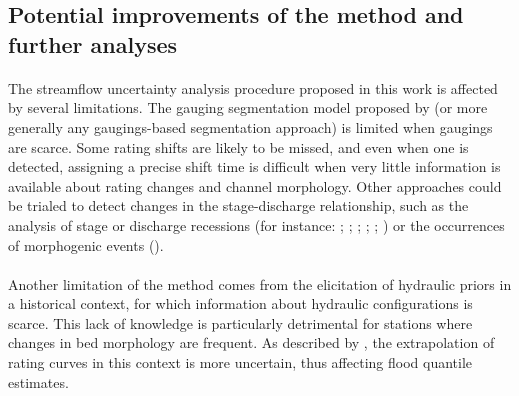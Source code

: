 \documentclass[11pt]{article}
\begin{document}
    
    \subsection{Potential improvements of the method and further analyses}
    \paragraph{}
    The streamflow uncertainty analysis procedure proposed in this work is affected by several limitations. The gauging segmentation model proposed by \citet{darienzo_detection_2021} (or more generally any gaugings-based segmentation approach) is limited when gaugings are scarce. Some rating shifts are likely to be missed, and even when one is detected, assigning a precise shift time is difficult when very little information is available about rating changes and channel morphology. Other approaches could be trialed to detect changes in the stage-discharge relationship, such as the analysis of stage or discharge recessions (for instance: \citet{nathan_evaluation_1990}; \citet{tallaksen_review_1995}; \citet{vogel_estimation_1996}; \citet{chapman_comparison_1999}; \citet{lang_extrapolation_2010}; \citet{darienzo_detection_2021-1}) or the occurrences of morphogenic events (\citet{darienzo_detection_2021-1}).    
    \paragraph{}
    Another limitation of the method comes from the elicitation of hydraulic priors in a historical context, for which information about hydraulic configurations is scarce. This lack of knowledge is particularly detrimental for stations where changes in bed morphology are frequent. As described by \citet{petersen-overleir_accounting_2009}, the extrapolation of rating curves in this context is more uncertain, thus affecting flood quantile estimates. 
\end{document}
